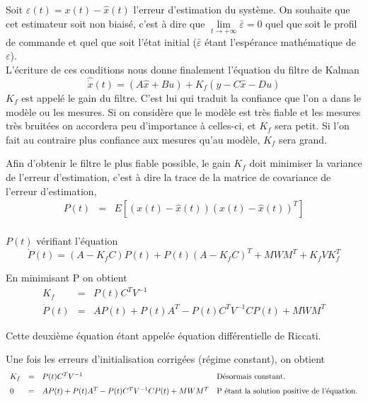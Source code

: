 \documentclass[12pt,twoside,a4paper]{article}
\begin{document}
\noindent Soit $\varepsilon(t)= x(t)-\hat x(t)$ l'erreur d'estimation du système. On souhaite que cet estimateur soit non biaisé, c'est à dire que $\lim\limits_{t \rightarrow +\infty } \bar{\varepsilon}= 0 $ quel que soit le profil de commande et quel que soit l'état initial ($\bar{\varepsilon}$ étant l'espérance mathématique de $\varepsilon$). 
\vspace{0.5cm}\\
L'écriture de ces conditions nous donne finalement l'équation du filtre de Kalman 
$$
\hat{\dot{x}}(t) = (A\hat x + Bu) + K_f (y -C \hat x -Du)
$$
$K_f$ est appelé le gain du filtre. C'est lui qui traduit la confiance que l'on a dans le modèle ou les mesures. Si on considère que le modèle est très fiable et les mesures très bruitées on accordera peu d'importance à celles-ci, et $K_f$ sera petit. Si l'on fait au contraire plus confiance aux mesures qu'au modèle, $K_f$ sera grand. 
\vspace{1cm}

Afin d'obtenir le filtre le plus fiable possible, le gain $K_f$ doit minimiser la variance de l'erreur d'estimation, c'est à dire la trace de la matrice de covariance de l'erreur d'estimation, 
$$
\begin{array}{lll}
P(t) &=& E[(x(t)-\hat x(t))(x(t)-\hat x(t))^T] \\
\end{array}
$$ 

$P(t)$ vérifiant l'équation
$$ 
\dot{P}(t) = (A-K_{f}C)P(t)+P(t)(A-K_{f}C)^{T} + MWM^{T} + K_{f}VK_{f}^{T}
$$

En minimisant P on obtient
$$
\begin{array}{lll}
K_f &=& P(t)C^T V^{-1} \\
\dot{P}(t) &= &AP(t) +P(t)A^T -P(t)C^TV^{-1}CP(t)+MWM^T
\end{array}
$$

Cette deuxième équation étant appelée équation différentielle de Riccati.
\vspace{1cm}

Une fois les erreurs d'initialisation corrigées (régime constant), on obtient 
$$
\begin{array}{llll}
K_f &=& P(t)C^T V^{-1} &\text{Désormais constant.}\\ 
0 &= &AP(t) +P(t)A^T -P(t)C^TV^{-1}CP(t)+MWM^T & \text{P étant la solution positive de l'équation.}
\rule[0pt]{0mm}{15pt} \\
\end{array}
$$
\end{document}
